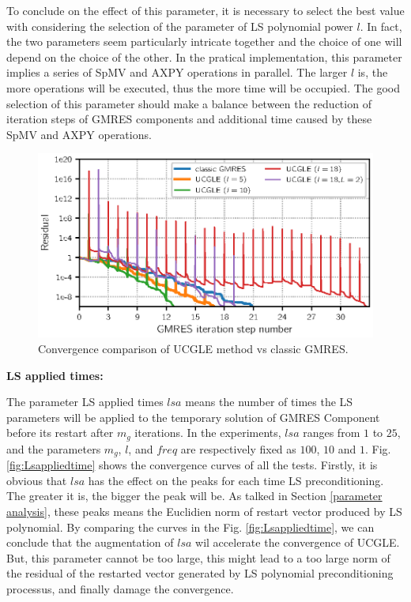 To conclude on the effect of this parameter, it is necessary to select the best value with considering the selection of the parameter of LS polynomial power $l$. In fact, the two parameters seem particularly intricate together and the choice of one will depend on the choice of the other. In the pratical implementation, this parameter implies a series of SpMV and AXPY operations in parallel. The larger $l$ is, the more operations will be executed, thus the more time will be occupied. The good selection of this parameter should make a balance between the reduction of iteration steps of GMRES components and additional time caused by these SpMV and AXPY operations.

\begin{figure}[htbp]
	\centering
	\includegraphics[width=6.2in]{fig/conv2.eps}
	\caption{Convergence comparison of UCGLE method vs classic GMRES.}
	\label{fig:lsdegree}
\end{figure}

\textbf{LS applied times: }

The parameter LS applied times $lsa$ means the number of times the LS parameters will be applied to the temporary solution of GMRES Component before its restart after $m_g$ iterations. In the experiments, $lsa$ ranges from $1$ to $25$, and the parameters $m_g$, $l$, and $freq$ are respectively fixed as $100$, $10$ and $1$. Fig. \ref{fig:Lsappliedtime} shows the convergence curves of all the tests. Firstly, it is obvious that $lsa$ has the effect on the peaks for each time LS preconditioning. The greater it is, the bigger the peak will be. As talked in Section \ref{parameter analysis}, these peaks means the Euclidien norm of restart vector produced by LS polynomial. By comparing the curves in  the Fig. \ref{fig:Lsappliedtime}, we can conclude that the augmentation of $lsa$ wil accelerate the convergence of UCGLE. But, this parameter cannot be too large, this might lead to a too large norm of the residual of the restarted vector generated by LS polynomial preconditioning processus, and finally damage the convergence.


